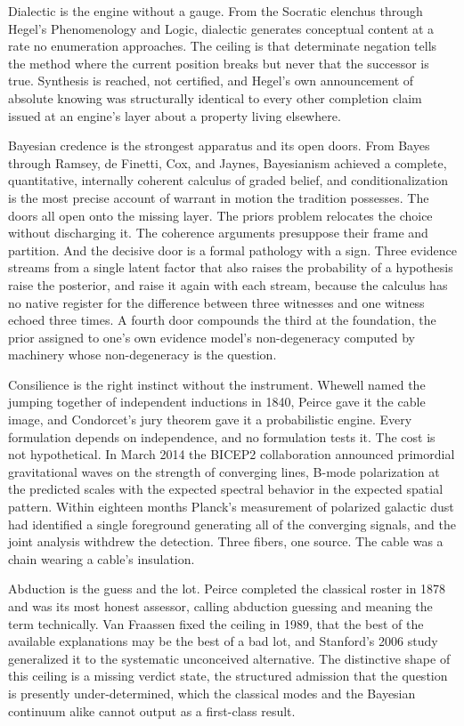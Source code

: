 \documentclass[10pt,twocolumn]{article}
\begin{document}
Dialectic is the engine without a gauge. From the Socratic elenchus
through Hegel's Phenomenology and Logic, dialectic generates conceptual
content at a rate no enumeration approaches. The ceiling is that
determinate negation tells the method where the current position breaks
but never that the successor is true. Synthesis is reached, not
certified, and Hegel's own announcement of absolute knowing was
structurally identical to every other completion claim issued at an
engine's layer about a property living elsewhere.

Bayesian credence is the strongest apparatus and its open doors. From
Bayes through Ramsey, de Finetti, Cox, and Jaynes, Bayesianism achieved
a complete, quantitative, internally coherent calculus of graded belief,
and conditionalization is the most precise account of warrant in motion
the tradition possesses. The doors all open onto the missing layer. The
priors problem relocates the choice without discharging it. The
coherence arguments presuppose their frame and partition. And the
decisive door is a formal pathology with a sign. Three evidence streams
from a single latent factor that also raises the probability of a
hypothesis raise the posterior, and raise it again with each stream,
because the calculus has no native register for the difference between
three witnesses and one witness echoed three times. A fourth door
compounds the third at the foundation, the prior assigned to one's own
evidence model's non-degeneracy computed by machinery whose
non-degeneracy is the question.

Consilience is the right instinct without the instrument. Whewell named
the jumping together of independent inductions in 1840, Peirce gave it
the cable image, and Condorcet's jury theorem gave it a probabilistic
engine. Every formulation depends on independence, and no formulation
tests it. The cost is not hypothetical. In March 2014 the BICEP2
collaboration announced primordial gravitational waves on the strength
of converging lines, B-mode polarization at the predicted scales with
the expected spectral behavior in the expected spatial pattern. Within
eighteen months Planck's measurement of polarized galactic dust had
identified a single foreground generating all of the converging signals,
and the joint analysis withdrew the detection. Three fibers, one source.
The cable was a chain wearing a cable's insulation.

Abduction is the guess and the lot. Peirce completed the classical
roster in 1878 and was its most honest assessor, calling abduction
guessing and meaning the term technically. Van Fraassen fixed the
ceiling in 1989, that the best of the available explanations may be the
best of a bad lot, and Stanford's 2006 study generalized it to the
systematic unconceived alternative. The distinctive shape of this
ceiling is a missing verdict state, the structured admission that the
question is presently under-determined, which the classical modes and
the Bayesian continuum alike cannot output as a first-class result.
\end{document}

